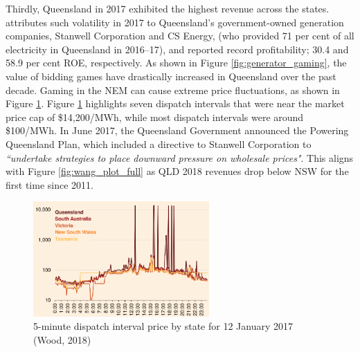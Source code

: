 Thirdly, Queensland in 2017 exhibited the highest revenue across the states. \parencite{grattan} attributes such volatility in 2017 to Queensland’s government-owned generation companies, Stanwell Corporation and CS Energy, (who provided 71 per cent of all electricity in Queensland in 2016–17), and reported record profitability; 30.4 and 58.9 per cent ROE, respectively. As shown in Figure \ref{fig:generator_gaming}, the value of bidding games have drastically increased in Queensland over the past decade. Gaming in the NEM can cause extreme price fluctuations, as shown in Figure \ref{fig:generator_gaming_1}. Figure \ref{fig:generator_gaming_1} highlights seven dispatch intervals that were near the market price cap of \$14,200/MWh, while most dispatch intervals were around \$100/MWh. In June 2017, the Queensland Government announced
the Powering Queensland Plan, which included a directive to Stanwell Corporation to \textit{“undertake strategies to place downward pressure on
wholesale prices"}. This aligns with Figure \ref{fig:wang_plot_full} as QLD 2018 revenues drop below NSW for the first time since 2011.
\begin{figure}
    \centering
    \includegraphics[width=0.6\textwidth]{Pictures/Chapter3/generator_gaming_2.png}
    \caption{5-minute dispatch interval
price by state for 12 January 2017 (Wood, 2018)}
    \label{fig:generator_gaming_1}
\end{figure}
